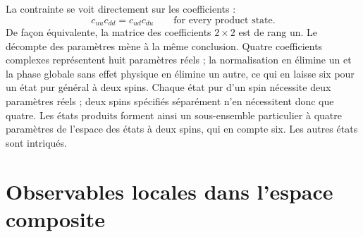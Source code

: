 La contrainte se voit directement sur les coefficients :
\begin{equation}
c_{uu}c_{dd}=c_{ud}c_{du}
\qquad\text{for every product state}.
\label{eq:l6-rank-one-condition}
\end{equation}De façon équivalente, la matrice des coefficients \(2\times2\) est de rang un. Le décompte des paramètres mène à la même conclusion. Quatre coefficients complexes représentent huit paramètres réels ; la normalisation en élimine un et la phase globale sans effet physique en élimine un autre, ce qui en laisse six pour un état pur général à deux spins. Chaque état pur d’un spin nécessite deux paramètres réels ; deux spins spécifiés séparément n’en nécessitent donc que quatre. Les états produits forment ainsi un sous-ensemble particulier à quatre paramètres de l’espace des états à deux spins, qui en compte six. Les autres états sont intriqués.

\section{Observables locales dans l’espace composite}

